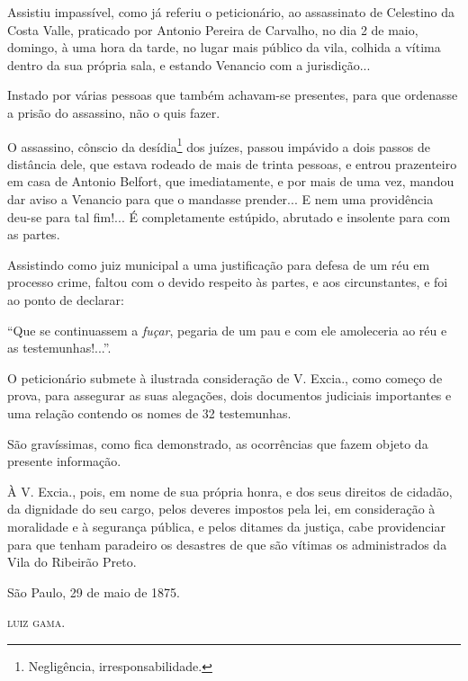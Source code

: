 Assistiu impassível, como já referiu o peticionário, ao assassinato de
Celestino da Costa Valle, praticado por Antonio Pereira de Carvalho, no
dia 2 de maio, domingo, à uma hora da tarde, no lugar mais público da
vila, colhida a vítima dentro da sua própria sala, e estando Venancio
com a jurisdição...

Instado por várias pessoas que também achavam-se presentes, para que
ordenasse a prisão do assassino, não o quis fazer.

O assassino, cônscio da desídia\footnote{ Negligência,
  irresponsabilidade.} dos juízes, passou impávido a dois passos de
distância dele, que estava rodeado de mais de trinta pessoas, e entrou
prazenteiro em casa de Antonio Belfort, que imediatamente, e por mais de
uma vez, mandou dar aviso a Venancio para que o mandasse prender... E
nem uma providência deu-se para tal fim!... É completamente estúpido,
abrutado e insolente para com as partes.

Assistindo como juiz municipal a uma justificação para defesa de um réu
em processo crime, faltou com o devido respeito às partes, e aos
circunstantes, e foi ao ponto de declarar:

``Que se continuassem a \emph{fuçar}, pegaria de um pau e com ele
amoleceria ao réu e as testemunhas!...''.

O peticionário submete à ilustrada consideração de V. Excia., como
começo de prova, para assegurar as suas alegações, dois documentos
judiciais importantes e uma relação contendo os nomes de 32 testemunhas.

São gravíssimas, como fica demonstrado, as ocorrências que fazem objeto
da presente informação.

À V. Excia., pois, em nome de sua própria honra, e dos seus direitos de
cidadão, da dignidade do seu cargo, pelos deveres impostos pela lei, em
consideração à moralidade e à segurança pública, e pelos ditames da
justiça, cabe providenciar para que tenham paradeiro os desastres de que
são vítimas os administrados da Vila do Ribeirão Preto.
\begin{flushright}
São Paulo, 29 de maio de 1875.

\textsc{luiz gama}.
\end{flushright}
\asterisc{}
